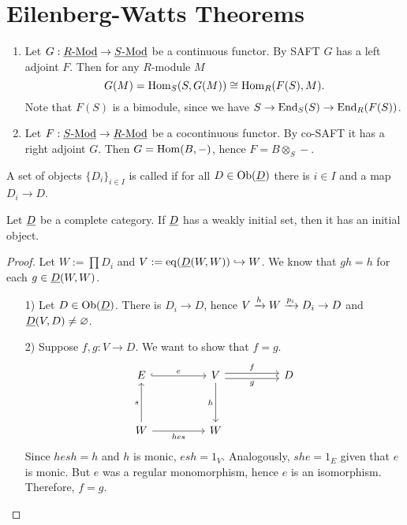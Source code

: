
\section{Eilenberg-Watts Theorems}

\begin{enumerate}
	\item Let \( G: \ctRMod \to \ctRMod[S] \) be a continuous functor. By SAFT \( G \) has a left adjoint \( F \). Then for any \( R \)-module \( M \)
		\[
			G(M) = \Hom_S(S, G(M)) \cong \Hom_R(F(S), M).
		\]
		Note that \( F(S) \) is a bimodule, since we have \( S \to \End_S(S) \to \End_R(F(S)) \).
	\item  Let \( F: \ctRMod[S] \to \ctRMod \) be a cocontinuous functor. By co-SAFT it has a right adjoint \( G \). Then \( G = \Hom(B, -) \), hence \( F = B \otimes_S - \).
\end{enumerate}

\begin{definition*}
	A set of objects \( \{D_i\}_{i \in I} \) is called  if for all \( D \in \Ob(\D) \) there is \( i \in I \) and a map \( D_i \to D \).
\end{definition*}

\begin{lemma*}
	Let \( \D \) be a complete category. If \( \D \) has a weakly initial set, then it has an initial object.
\end{lemma*}
\begin{proof}
	Let \( W := \prod D_i \) and \( V := \eq(\D(W, W)) \inc W \). We know that \( gh = h \) for each \( g \in \D(W, W) \).
	\begin{enumerate}
		\item[1)] Let \( D \in \Ob(\D) \). There is \( D_i \to D \), hence \( V \tox{h} W \tox{p_i} D_i \to D \) and \( \D(V, D) \neq \varnothing \).
		\item[2)] Suppose \( f,g: V \to D \). We want to show that \( f = g \).
			\[
				\begin{tikzcd}
					E && V && D \\
					\\
					W && W
					\arrow["e", hook, from=1-1, to=1-3]
					\arrow["f", shift left, from=1-3, to=1-5]
					\arrow["g"', shift right, from=1-3, to=1-5]
					\arrow["h"', from=1-3, to=3-3]
					\arrow["s", from=3-1, to=1-1]
					\arrow["hes"', from=3-1, to=3-3]
				\end{tikzcd}
			\]
			Since \( hesh = h \) and \( h \) is monic, \( esh = 1_V \). Analogously, \( she = 1_E \) given that \( e \) is monic. But \( e \) was a regular monomorphism, hence \( e \) is an isomorphism. Therefore, \( f = g \).
	\end{enumerate}
\end{proof}

